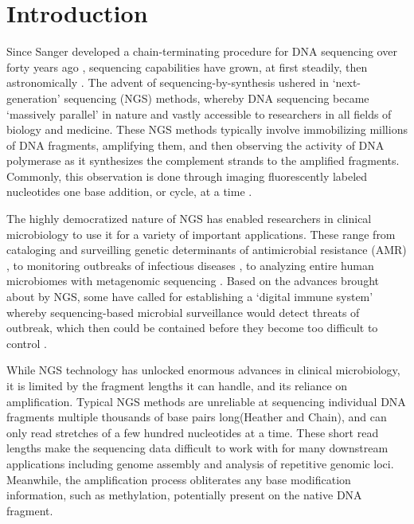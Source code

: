 \chapter{Introduction}
\label{chap:intro}

Since Sanger developed a chain-terminating procedure for DNA sequencing over forty years ago \citep{Sanger1977-lo}, sequencing capabilities have grown, at first steadily, then astronomically \citep{Schatz2013-vw}. The advent of sequencing-by-synthesis ushered in ‘next-generation’ sequencing (NGS) methods, whereby DNA sequencing became ‘massively parallel’ in nature and vastly accessible to researchers in all fields of biology and medicine. These NGS methods typically involve immobilizing millions of DNA fragments, amplifying them, and then observing the activity of DNA polymerase as it synthesizes the complement strands to the amplified fragments. Commonly, this observation is done through imaging fluorescently labeled nucleotides one base addition, or cycle, at a time \citep{Shendure2017-oy}.

The highly democratized nature of NGS has enabled researchers in clinical microbiology to use it for a variety of important applications. These range from cataloging and surveilling genetic determinants of antimicrobial resistance (AMR) \citep{Crofts2017-ni, Canica2019-ho, Toth2020-ov, Thanner2016-wy, Hendriksen2019-qi}, to monitoring outbreaks of infectious diseases \citep{Dipaola2020-bw, Lu2020-ti}, to analyzing entire human microbiomes with metagenomic sequencing \citep{Chiu2019-cg}. Based on the advances brought about by NGS, some have called for establishing a ‘digital immune system’ whereby sequencing-based microbial surveillance would detect threats of outbreak, which then could be contained before they become too difficult to control \citep{Schatz2012-ow}.

While NGS technology has unlocked enormous advances in clinical microbiology, it is limited by the fragment lengths it can handle, and its reliance on amplification. Typical NGS methods are unreliable at sequencing individual DNA fragments multiple thousands of base pairs long(Heather and Chain), and can only read stretches of a few hundred nucleotides at a time. These short read lengths make the sequencing data difficult to work with for many downstream applications including genome assembly and analysis of repetitive genomic loci. Meanwhile, the amplification process obliterates any base modification information, such as methylation, potentially present on the native DNA fragment.

